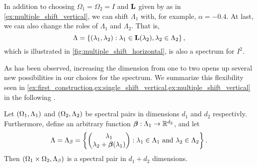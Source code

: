 \documentclass[../thesis.tex]{subfiles}
\begin{document}
\begin{remark}\label{rem:switch_lambda}
    In addition to choosing $\Omega_1=\Omega_2 = I$ and $\mathbf{L}$ given by  as in \cref{ex:multiple_shift_vertical}, we can shift $\Lambda_1$ with, for example, $\alpha = -0.4$. %
    At last, we can also change the roles of $\Lambda_1$ and $\Lambda_2$. That is,
    \begin{equation}\label{eq:lam_multiple_shift_horizontal}
        \Lambda = \left\{\left(\lambda_1, \lambda_2\right): \lambda_1 \in \mathbf{L}(\lambda_2), \lambda_2 \in \Lambda_2 \right\},
    \end{equation}
    which is illustrated in \cref{fig:multiple_shift_horizontal}, is also a spectrum for $I^2$.
\end{remark}
As has been observed, increasing the dimension from one to two opens up several new possibilities in our choices for the spectrum. We summarize this flexibility seen in \cref{ex:first_construction,ex:single_shift_vertical,ex:multiple_shift_vertical} in the following .
\begin{lemma}\label{lem:beta_shift}
    Let $(\Omega_1,\Lambda_1)$ and $(\Omega_2,\Lambda_2)$ be spectral pairs in dimensions $d_1$ and $d_2$ respectivly. Furthermore, define an arbitrary function $\bm{\beta}: \Lambda_1 \rightarrow \mathbb{R}^{d_2}$, and let
    \begin{equation}
        \Lambda = \Lambda_\beta
        = \left\{\begin{pmatrix}
            \lambda_1 \\
            \lambda_2+\bm{\beta}(\lambda_1)
            \end{pmatrix}
        : \lambda_1 \in \Lambda_1 \text{ and } \lambda_2 \in \Lambda_2\right\}.
    \end{equation}
    Then $(\Omega_1 \times \Omega_2,\Lambda_\beta)$ is a spectral pair in $d_1+d_2$ dimensions. 
\end{lemma}
\end{document}

